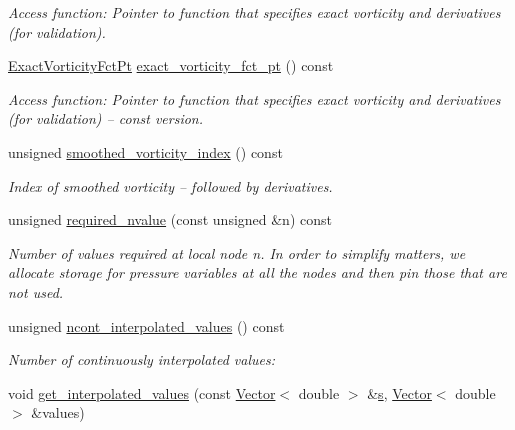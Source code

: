 \begin{DoxyCompactItemize}
\begin{DoxyCompactList}\small\item\em Access function\+: Pointer to function that specifies exact vorticity and derivatives (for validation). \end{DoxyCompactList}\item 
\hyperlink{classoomph_1_1VorticitySmootherElement_ad4ed9d81ba7718bf747e0abdd41cdaa1}{Exact\+Vorticity\+Fct\+Pt} \hyperlink{classoomph_1_1VorticitySmootherElement_af554c9bc41710d8b042a51c19383351e}{exact\+\_\+vorticity\+\_\+fct\+\_\+pt} () const
\begin{DoxyCompactList}\small\item\em Access function\+: Pointer to function that specifies exact vorticity and derivatives (for validation) -- const version. \end{DoxyCompactList}\item 
unsigned \hyperlink{classoomph_1_1VorticitySmootherElement_a5297ce9dd4c4d23fa99daafc2764d7db}{smoothed\+\_\+vorticity\+\_\+index} () const
\begin{DoxyCompactList}\small\item\em Index of smoothed vorticity -- followed by derivatives. \end{DoxyCompactList}\item 
unsigned \hyperlink{classoomph_1_1VorticitySmootherElement_abec3461fcb00b7cbab8aee26f996c1ed}{required\+\_\+nvalue} (const unsigned \&n) const
\begin{DoxyCompactList}\small\item\em Number of values required at local node n. In order to simplify matters, we allocate storage for pressure variables at all the nodes and then pin those that are not used. \end{DoxyCompactList}\item 
unsigned \hyperlink{classoomph_1_1VorticitySmootherElement_a15559517f708dbdfe51e2e94f5bca3dc}{ncont\+\_\+interpolated\+\_\+values} () const
\begin{DoxyCompactList}\small\item\em Number of continuously interpolated values\+: \end{DoxyCompactList}\item 
void \hyperlink{classoomph_1_1VorticitySmootherElement_a4f7da8484a949a875d411cca340f37e2}{get\+\_\+interpolated\+\_\+values} (const \hyperlink{classoomph_1_1Vector}{Vector}$<$ double $>$ \&\hyperlink{cfortran_8h_ab7123126e4885ef647dd9c6e3807a21c}{s}, \hyperlink{classoomph_1_1Vector}{Vector}$<$ double $>$ \&values)

\end{DoxyCompactItemize}
